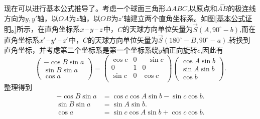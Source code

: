\documentclass[11pt, a4paper, oneside]{ctexart}
\numberwithin{equation}{subsection}
\begin{document}
现在可以进行基本公式推导了。考虑一个球面三角形$\Delta ABC$,以原点和$\overset{\frown}{AB}$的极连线方向为$y,y'$轴，以$OA$为$z$轴，以$OB$为$z'$轴建立两个直角坐标系。如图\ref{基本公式证明。}所示，在直角坐标系$x\,\text{\textendash}\,y\,\text{\textendash}\,z$中，$C$的天球方向单位矢量为$\vec{S}\left(A,90^{\circ}-b\right)$,而在直角坐标系$x'\,\text{\textendash}\,y'\,\text{\textendash}\,z'$中，$C$的天球方向单位矢量为$\vec{S}\left(180^{\circ}-B,90^{\circ}-a\right)$.转换到直角坐标，并考虑第二个坐标系是第一个坐标系绕$y$轴正向旋转$c$,因此有
\begin{equation}
\begin{pmatrix}
-\cos B\sin a\\
\sin B\sin a\\
\cos a
\end{pmatrix}=
\begin{pmatrix}
\cos c & 0 & -\sin c\\
0 & 1 & 0\\
\sin c & 0 & \cos c\\
\end{pmatrix}
\begin{pmatrix}
\cos A\sin b\\
\sin A\sin b\\
\cos b
\end{pmatrix}.
\end{equation}
整理得到
\begin{align}
-\cos B\sin a&=\cos c\cos A\sin b-\sin c\cos b.\label{1.1.9}\\
\sin B\sin a&=\sin A\sin b.\label{1.1.10}\\
\cos a&=\sin c\cos A\sin b+\cos c\cos b.\label{1.1.11}
\end{align}
\end{document}
